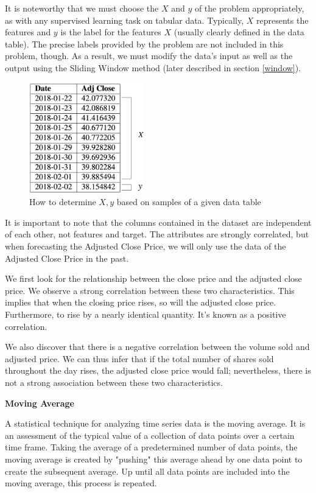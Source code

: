 \documentclass[a4paper]{article}
\begin{document}
It is noteworthy that we must choose the $X$ and $y$ of the problem appropriately, as with any supervised learning task on tabular data. Typically, $X$ represents the features and $y$ is the label for the features $X$ (usually clearly defined in the data table). The precise labels provided by the problem are not included in this problem, though. As a result, we must modify the data's input as well as the output using the Sliding Window method (later described in section \ref{window}).

\begin{figure}
    \centering
    \includegraphics[width=5cm]{target.png}
    \caption{How to determine $X, y$ based on samples of a given data table}
    \label{fig:xy}
\end{figure}

It is important to note that the columns contained in the dataset are independent of each other, not features and target. The attributes are strongly correlated, but when forecasting the Adjusted Close Price, we will only use the data of the Adjusted Close Price in the past.

We first look for the relationship between the close price and the adjusted close price. We observe a strong correlation between these two characteristics. This implies that when the closing price rises, so will the adjusted close price. Furthermore, to rise by a nearly identical quantity. It's known as a positive correlation.

We also discover that there is a negative correlation between the volume sold and adjusted price. We can thus infer that if the total number of shares sold throughout the day rises, the adjusted close price would fall; nevertheless, there is not a strong association between these two characteristics.

\textbf{Moving Average}

A statistical technique for analyzing time series data is the moving average. It is an assessment of the typical value of a collection of data points over a certain time frame. Taking the average of a predetermined number of data points, the moving average is created by "pushing" this average ahead by one data point to create the subsequent average. Up until all data points are included into the moving average, this process is repeated.
\end{document}
